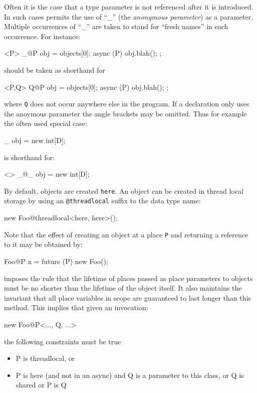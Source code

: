 Often it is the case that a type parameter is not referenced after it
is introduced. In such cases \Xten{} permits the use of ``\_'' (the
{\em anonymous
parameter})\label{AnonymousParameter}
as a parameter. Multiple occurrences of ``\_'' are taken to stand for
``fresh names'' in each occurrence.  For instance:
\begin{x10}
 <P> \_@P obj = objects[0];
 async (P) { obj.blah(); };
\end{x10}
\noindent should be taken as shorthand for
\begin{x10}
 <P,Q> Q@P obj = objects[0];
 async (P) { obj.blah(); };
\end{x10}
{}\noindent where {\tt Q} does not occur anywhere else in the
program. If a declaration only uses the anoymous parameter the angle
brackets may be omitted. Thus for example the often used special case:
\begin{x10}
  \_ obj = new int[D];
\end{x10}
\noindent is shorthand for:
\begin{x10}
  <> \_@\_ obj = new int[D];
\end{x10}

{}\noindent By default, objects are created {\tt here}. An object can
be created in thread local storage by using an {\tt @threadlocal}
suffix to the data type name:
\begin{x10}
   new Foo@threadlocal<here, here>();
\end{x10}


Note that the effect of creating an object at a place {\tt P} and
returning a reference to it may be obtained by:
\begin{x10}
    Foo@P x = future (P) { new Foo();}
\end{x10}

{}\Xten{} imposes the rule that the lifetime of places passed as place
parameters to objects must be no shorter than the lifetime of the
object itself. It also maintains the invariant that all place variables
in scope are guaranteed to last longer than this method. This implies
that given an invocation:
\begin{x10}
    new Foo@P<..., Q, ...>
\end{x10}
\noindent the following constraints must be true
\begin{itemize}
\item {\cf P} is {\cf threadlocal},  or
\item {\cf P} is {\cf here} (and not in an {\cf async}) and {\cf Q} is a parameter to this class, or {\cf Q} is {\cf shared} or {\cf P} is {\cf Q}
\end{itemize}

